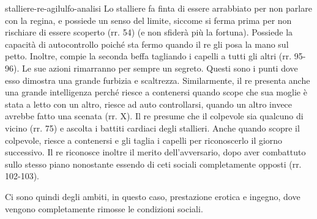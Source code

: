 \documentclass[preview]{standalone}
\begin{document}
\begin{snippet}{stalliere-re-agilulfo-analisi}
    Lo stalliere fa finta di essere arrabbiato per non parlare con la regina, e
    possiede un senso del limite, siccome si ferma prima per non rischiare di essere scoperto (rr. 54) (e non sfiderà più la fortuna).
    Possiede la capacità di autocontrollo poiché sta fermo quando il re gli posa la mano
    sul petto. Inoltre, compie la seconda beffa tagliando i capelli a tutti gli altri (rr. 95-96).
    Le sue azioni rimarranno per sempre un segreto.
    Questi sono i punti dove esso dimostra una grande furbizia e scaltrezza.
    Similarmente, il re presenta anche una grande intelligenza
    perché riesce a contenersi quando scope che sua moglie è stata a letto con un altro,
    riesce ad auto controllarsi, quando un altro invece avrebbe fatto una scenata (rr. X).
    Il re presume che il colpevole sia qualcuno di vicino (rr. 75) e ascolta i battiti
    cardiaci degli stallieri. Anche quando scopre il colpevole, riesce a contenersi e gli taglia
    i capelli per riconoscerlo il giorno successivo.
    Il re riconosce inoltre il merito dell'avversario, dopo aver combattuto sullo stesso
    piano nonostante essendo di ceti sociali completamente opposti (rr. 102-103).
    
    Ci sono quindi degli ambiti, in questo caso, prestazione erotica e ingegno,
    dove vengono completamente rimosse le condizioni sociali.
\end{snippet}
\end{document}

